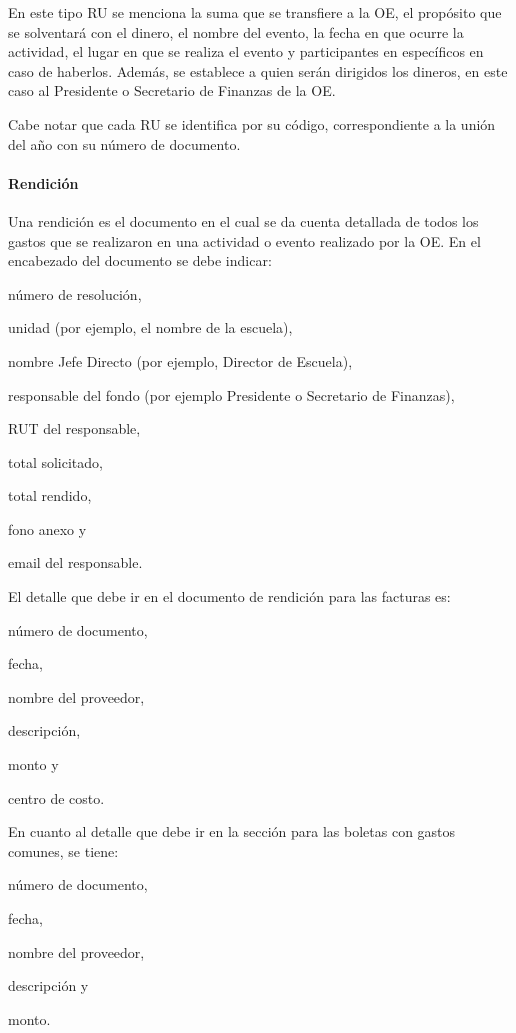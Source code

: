   En este tipo RU se menciona la suma que se transfiere a la OE, el propósito que se solventará con el dinero, el nombre del evento, la fecha en que ocurre la actividad, el lugar en que se realiza el evento y participantes en específicos en caso de haberlos. Además, se establece a quien serán dirigidos los dineros, en este caso al Presidente o Secretario de Finanzas de la OE.

  Cabe notar que cada RU se identifica por su código, correspondiente a la unión del año con su número de documento.

  \paragraph{Rendición}

  Una rendición es el documento en el cual se da cuenta detallada de todos los gastos que se realizaron en una actividad o evento realizado por la OE. En el encabezado del documento se debe indicar:
  \begin{enumerate*}[label=(\roman*)]
    \item número de resolución,
    \item unidad (por ejemplo, el nombre de la escuela),
    \item nombre Jefe Directo (por ejemplo, Director de Escuela),
    \item responsable del fondo (por ejemplo Presidente o Secretario de Finanzas),
    \item RUT del responsable,
    \item total solicitado,
    \item total rendido,
    \item fono anexo y
    \item email del responsable.
  \end{enumerate*}
  
  El detalle que debe ir en el documento de rendición para las facturas es:
  \begin{enumerate*}[label=(\roman*)]
    \item número de documento,
    \item fecha,
    \item nombre del proveedor,
    \item descripción,
    \item monto y
    \item centro de costo.
  \end{enumerate*}
  
  En cuanto al detalle que debe ir en la sección para las boletas con gastos comunes, se tiene:
  \begin{enumerate*}[label=(\roman*)]
    \item número de documento,
    \item fecha,
    \item nombre del proveedor,
    \item descripción y
    \item monto.
  \end{enumerate*}
  
